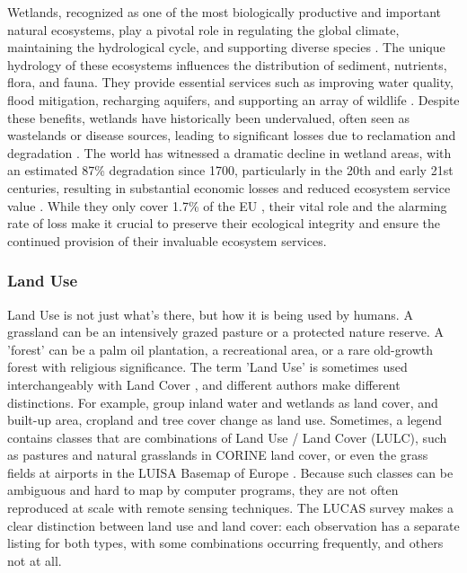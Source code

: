         Wetlands, recognized as one of the most biologically productive and important natural ecosystems, play a pivotal role in regulating the global climate, maintaining the hydrological cycle, and supporting diverse species \citep{hu2017global,ramsar2001wetlands}. The unique hydrology of these ecosystems influences the distribution of sediment, nutrients, flora, and fauna. They provide essential services such as improving water quality, flood mitigation, recharging aquifers, and supporting an array of wildlife \citep{costanza1997value,smardon2009sustaining}. Despite these benefits, wetlands have historically been undervalued, often seen as wastelands or disease sources, leading to significant losses due to reclamation and degradation \citep{giblett1996postmodern,owens2001global,davidson2014much,gardner2018global,dugan1993wetlands,oecd1996guidelines,ramsar2015wetlands}. The world has witnessed a dramatic decline in wetland areas, with an estimated 87\% degradation since 1700, particularly in the 20th and early 21st centuries, resulting in substantial economic losses and reduced ecosystem service value \citep{gardner2015state,costanza2014changes}. While they only cover 1.7\% of the EU \citep{eurostat2021land}, their vital role and the alarming rate of loss make it crucial to preserve their ecological integrity and ensure the continued provision of their invaluable ecosystem services.

    \subsubsection{Land Use}

        Land Use is not just what's there, but how it is being used by humans. A grassland can be an intensively grazed pasture or a protected nature reserve. A 'forest' can be a palm oil plantation, a recreational area, or a rare old-growth forest with religious significance. The term 'Land Use' is sometimes used interchangeably with Land Cover \citep{fisher2005land}, and different authors make different distinctions. For example, \citet{hansen2022global} group inland water and wetlands as land cover, and built-up area, cropland and tree cover change as land use. Sometimes, a legend contains classes that are combinations of Land Use / Land Cover (LULC), such as pastures and natural grasslands in CORINE land cover, or even the grass fields at airports in the LUISA Basemap of Europe \citep{pigaiani2021luisa}. Because such classes can be ambiguous and hard to map by computer programs, they are not often reproduced at scale with remote sensing techniques. The LUCAS survey makes a clear distinction between land use and land cover: each observation has a separate listing for both types, with some combinations occurring frequently, and others not at all.

